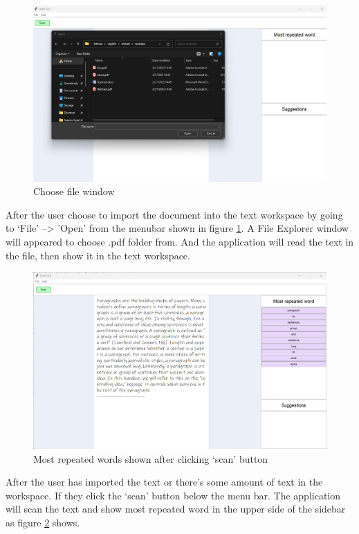 \documentclass[12pt,oneside,openright,a4paper]{cpe-english-project}
\begin{document}
\begin{figure}[!h]\centering
\includegraphics[width=15cm]{./img/chp4/open.png}
\caption{Choose file window}\label{fig:ui3}
\end{figure}

After the user choose to import the document into the text workspace by going to ‘File’ --> ’Open’ from the menubar shown in figure \ref{fig:ui3}. A File Explorer window will appeared to choose .pdf folder from. And the application will read the text in the file, then show it in the text workspace.\\

\begin{figure}[!h]\centering
\includegraphics[width=15cm]{./img/chp4/scan.png}
\caption{Most repeated words shown after clicking ‘scan’ button}\label{fig:ui4}
\end{figure}

After the user has imported the text or there’s some amount of text in the workspace. If they click the ‘scan’ button below the menu bar. The application will scan the text and show  most repeated word in the upper side of the sidebar as figure \ref{fig:ui4} shows.\\
\end{document}
